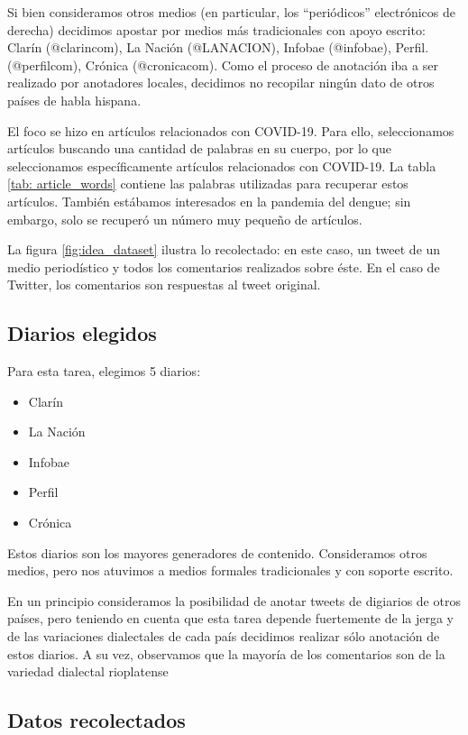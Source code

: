 Si bien consideramos otros medios (en particular, los ``periódicos'' electrónicos de derecha) decidimos apostar por medios más tradicionales con apoyo escrito: Clarín (@clarincom), La Nación (@LANACION), Infobae (@infobae), Perfil. (@perfilcom), Crónica (@cronicacom). Como el proceso de anotación iba a ser realizado por anotadores locales, decidimos no recopilar ningún dato de otros países de habla hispana.


El foco se hizo en artículos relacionados con COVID-19. Para ello, seleccionamos artículos buscando una cantidad de palabras en su cuerpo, por lo que seleccionamos específicamente artículos relacionados con COVID-19. La tabla \ref{tab: article_words} contiene las palabras utilizadas para recuperar estos artículos. También estábamos interesados en la pandemia del dengue; sin embargo, solo se recuperó un número muy pequeño de artículos.

La figura \ref{fig:idea_dataset} ilustra lo recolectado: en este caso, un tweet de un medio periodístico y todos los comentarios realizados sobre éste. En el caso de Twitter, los comentarios son respuestas al tweet original.


\subsection{Diarios elegidos}

Para esta tarea, elegimos 5 diarios:

\begin{itemize}
    \item Clarín
    \item La Nación
    \item Infobae
    \item Perfil
    \item Crónica
\end{itemize}

Estos diarios son los mayores generadores de contenido. Consideramos otros medios, pero nos atuvimos a medios formales tradicionales y con soporte escrito.

En un principio consideramos la posibilidad de anotar tweets de digiarios de otros países, pero teniendo en cuenta que esta tarea depende fuertemente de la jerga y de las variaciones dialectales de cada país decidimos realizar sólo anotación de estos diarios. A su vez, observamos que la mayoría de los comentarios son de la variedad dialectal rioplatense


\subsection{Datos recolectados}

